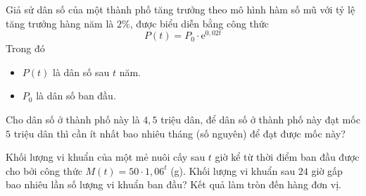 \begin{bt}%

	Giả sử dân số của một thành phố tăng trưởng theo mô hình hàm số mũ với tỷ lệ tăng trưởng hàng năm là $2\%$, được biểu diễn bằng công thức
	$$P(t)=P_0\cdot \mathrm{e}^{0{,}02t}$$
	Trong đó
	\begin{itemize}
		\item $P(t)$ là dân số sau $t$ năm.
		\item $P_0$ là dân số ban đầu.
	\end{itemize}
	Cho dân số ở thành phố này là $4{,}5$ triệu dân, để dân số ở thành phố này đạt mốc $5$ triệu dân thì cần ít nhất bao nhiêu tháng (số nguyên) để đạt được mốc này?
\end{bt}

\begin{bt}%

	Khối lượng vi khuẩn của một mẻ nuôi cấy sau $ t$ giờ kể từ thời điểm ban đầu được cho bởi công thức $M(t)=50\cdot 1{,}06^t$ (g). Khối lượng vi khuẩn sau $24$ giờ gấp bao nhiêu lần số lượng vi khuẩn ban đầu? Kết quả làm tròn đến hàng đơn vị.
\end{bt}


